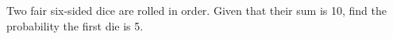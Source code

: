 Two fair six-sided dice are rolled in order. Given that their sum is 10, find the probability the first die is 5.
